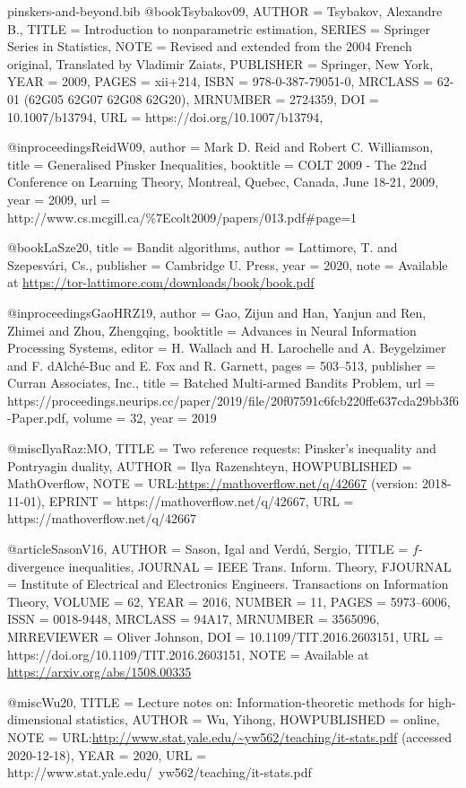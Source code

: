 \documentclass[10pt]{article}
\begin{document}
\begin{filecontents}{pinskers-and-beyond.bib}
@book{Tsybakov09,
    AUTHOR = {Tsybakov, Alexandre B.},
     TITLE = {Introduction to nonparametric estimation},
    SERIES = {Springer Series in Statistics},
      NOTE = {Revised and extended from the 2004 French original,
              Translated by Vladimir Zaiats},
 PUBLISHER = {Springer, New York},
      YEAR = {2009},
     PAGES = {xii+214},
      ISBN = {978-0-387-79051-0},
   MRCLASS = {62-01 (62G05 62G07 62G08 62G20)},
  MRNUMBER = {2724359},
       DOI = {10.1007/b13794},
       URL = {https://doi.org/10.1007/b13794},
}

@inproceedings{ReidW09,
  author    = {Mark D. Reid and
               Robert C. Williamson},
  title     = {Generalised Pinsker Inequalities},
  booktitle = {{COLT} 2009 - The 22nd Conference on Learning Theory, Montreal, Quebec,
               Canada, June 18-21, 2009},
  year      = {2009},
  url       = {http://www.cs.mcgill.ca/\%7Ecolt2009/papers/013.pdf\#page=1}
}

@book{LaSze20,
  title     = {Bandit algorithms},
  author    = {Lattimore, T. and Szepesv{\'a}ri, {\relax Cs}.},
  publisher = {Cambridge U. Press},
  year = {2020},
  note = {Available at \url{https://tor-lattimore.com/downloads/book/book.pdf}}
}

@inproceedings{GaoHRZ19,
 author = {Gao, Zijun and Han, Yanjun and Ren, Zhimei and Zhou, Zhengqing},
 booktitle = {Advances in Neural Information Processing Systems},
 editor = {H. Wallach and H. Larochelle and A. Beygelzimer and F. d\textquotesingle Alch\'{e}-Buc and E. Fox and R. Garnett},
 pages = {503--513},
 publisher = {Curran Associates, Inc.},
 title = {Batched Multi-armed Bandits Problem},
 url = {https://proceedings.neurips.cc/paper/2019/file/20f07591c6fcb220ffe637cda29bb3f6-Paper.pdf},
 volume = {32},
 year = {2019}
}

@misc{IlyaRaz:MO,
    TITLE = {{Two reference requests: Pinsker's inequality and Pontryagin duality}},
    AUTHOR = {Ilya Razenshteyn},
    HOWPUBLISHED = {MathOverflow},
    NOTE = {URL:\url{https://mathoverflow.net/q/42667} (version: 2018-11-01)},
    EPRINT = {https://mathoverflow.net/q/42667},
    URL = {https://mathoverflow.net/q/42667}
}

@article{SasonV16,
    AUTHOR = {Sason, Igal and Verd\'{u}, Sergio},
     TITLE = {{$f$}-divergence inequalities},
   JOURNAL = {IEEE Trans. Inform. Theory},
  FJOURNAL = {Institute of Electrical and Electronics Engineers.
              Transactions on Information Theory},
    VOLUME = {62},
      YEAR = {2016},
    NUMBER = {11},
     PAGES = {5973--6006},
      ISSN = {0018-9448},
   MRCLASS = {94A17},
  MRNUMBER = {3565096},
MRREVIEWER = {Oliver Johnson},
       DOI = {10.1109/TIT.2016.2603151},
       URL = {https://doi.org/10.1109/TIT.2016.2603151},
      NOTE = {Available at \url{https://arxiv.org/abs/1508.00335}}
}

@misc{Wu20,
  TITLE = {Lecture notes on: Information-theoretic methods for high-dimensional statistics},
  AUTHOR = {Wu, Yihong},
  HOWPUBLISHED = {online},
  NOTE = {URL:\url{http://www.stat.yale.edu/~yw562/teaching/it-stats.pdf} (accessed 2020-12-18)},
  YEAR = {2020},
  URL = {http://www.stat.yale.edu/~yw562/teaching/it-stats.pdf}
}
\end{filecontents}


\end{document}
